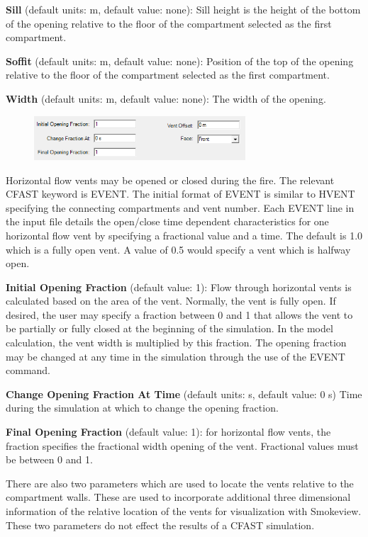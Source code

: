\textbf{Sill} (default units: m, default value: none): Sill height is the height of the bottom of the opening relative to the floor of the compartment selected as the first compartment.

\textbf{Soffit} (default units: m, default value: none): Position of the top of the opening relative to the floor of the compartment selected as the first compartment.

\textbf{Width} (default units: m, default value: none): The width of the opening.

\begin{figure}[h!]
\begin{center}
\includegraphics[width=3.1in]{FIGURES/Input_File/Vent_Open_Close}
\end{center}
\end{figure}

Horizontal flow vents may be opened or closed during the fire. The relevant CFAST keyword is EVENT. The initial format of EVENT is similar to HVENT specifying the connecting compartments and vent number.  Each EVENT line in the input file details the open/close time dependent characteristics for one horizontal flow vent by specifying a fractional value and a time.  The default is 1.0 which is a fully open vent.  A value of 0.5 would specify a vent which is halfway open.

\textbf{Initial Opening Fraction} (default value: 1): Flow through horizontal vents is calculated based on the area of the vent.  Normally, the vent is fully open.  If desired, the user may specify a fraction between 0 and 1 that allows the vent to be partially or fully closed at the beginning of the simulation.  In the model calculation, the vent width is multiplied by this fraction.  The opening fraction may be changed at any time in the simulation through the use of the EVENT command.

\textbf{Change Opening Fraction At Time}  (default units: s, default value: 0 s)  Time during the simulation at which to change the opening fraction.

\textbf{Final Opening Fraction} (default value: 1): for horizontal flow vents, the fraction specifies the fractional width opening of the vent. Fractional values must be between 0 and 1.

There are also two parameters which are used to locate the vents relative to the compartment walls. These are used to incorporate additional three dimensional information of the relative location of the vents for visualization with Smokeview. These two parameters do not effect the results of a CFAST simulation.

